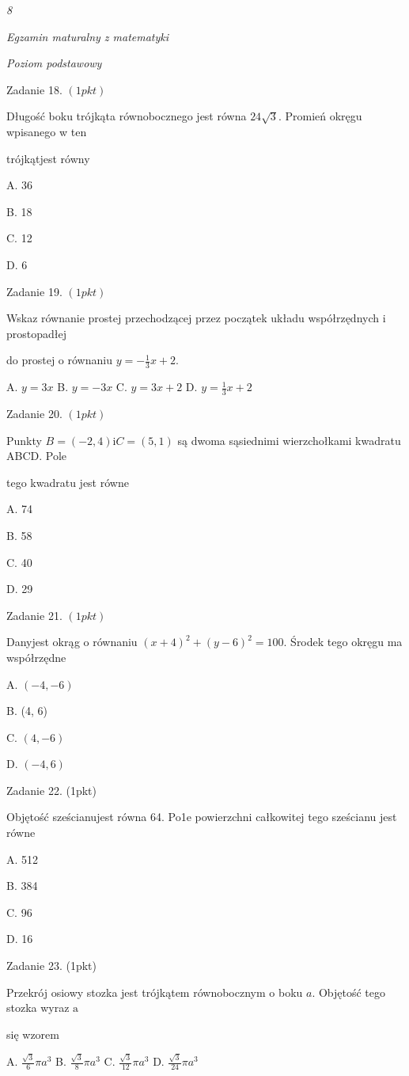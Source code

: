 \documentclass[a4paper,12pt]{article}
\begin{document}
{\it 8}

{\it Egzamin maturalny z matematyki}

{\it Poziom podstawowy}

Zadanie 18. $(1pkt)$

Długość boku trójkąta równobocznego jest równa $24\sqrt{3}$. Promień okręgu wpisanego w ten

trójkątjest równy

A. 36

B. 18

C. 12

D. 6

Zadanie 19. $(1pkt)$

Wskaz równanie prostej przechodzącej przez początek układu współrzędnych i prostopadłej

do prostej o równaniu $y=-\displaystyle \frac{1}{3}x+2.$

A. $y=3x$ B. $y=-3x$ C. $y=3x+2$ D. $y=\displaystyle \frac{1}{3}x+2$

Zadanie 20. $(1pkt)$

Punkty $B=(-2,4) \mathrm{i} C=(5,1)$ są dwoma sąsiednimi wierzchołkami kwadratu ABCD. Pole

tego kwadratu jest równe

A. 74

B. 58

C. 40

D. 29

Zadanie 21. $(1pkt)$

Danyjest okrąg o równaniu $(x+4)^{2}+(y-6)^{2}=100$. Środek tego okręgu ma współrzędne

A. $(-4,-6)$

B. (4, 6)

C. $(4,-6)$

D. $(-4,6)$

Zadanie 22. (1pkt)

Objętość sześcianujest równa 64. Po1e powierzchni całkowitej tego sześcianu jest równe

A. 512

B. 384

C. 96

D. 16

Zadanie 23. (1pkt)

Przekrój osiowy stozka jest trójkątem równobocznym o boku $a$. Objętość tego stozka wyraz $\mathrm{a}$

się wzorem

A. $\displaystyle \frac{\sqrt{3}}{6}\pi a^{3}$ B. $\displaystyle \frac{\sqrt{3}}{8}\pi a^{3}$ C. $\displaystyle \frac{\sqrt{3}}{12}\pi a^{3}$ D. $\displaystyle \frac{\sqrt{3}}{24}\pi a^{3}$
\end{document}
